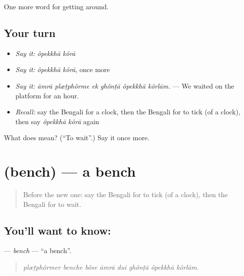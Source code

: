 \begin{grammarlens}[title={What you've built}]
One more word for getting around.
\end{grammarlens}

\subsection*{Your turn}
\begin{itemize}
\raggedright
  \item \emph{Say it:} \emph{ôpekkhā kôrā}
  \item \emph{Say it:} \emph{ôpekkhā kôrā}, once more
  \item \emph{Say it:} \emph{āmrā plæṭphôrme ek ghônṭā ôpekkhā kôrlām.} — We waited on the platform for an hour.
  \item \emph{Recall:} say the Bengali for a clock, then the Bengali for to tick (of a clock), then say \emph{ôpekkhā kôrā} again
\end{itemize}

\begin{tcolorbox}[breakable,colback=teal!4,colframe=teal!35!black,title={Before you move on}]
What does   mean? (\textquotedblleft{}To wait\textquotedblright{}.) Say it once more.
\end{tcolorbox}
\section[\texorpdfstring{\bn{বেঞ্চ} (bench)}{বেঞ্চ (bench)}]{ (bench) — a bench}

\label{lesson:BN-C385-bench}



\begin{quote}
Before the new one: say the Bengali for to tick (of a clock), then the Bengali for to wait.
\end{quote}

\subsection*{You'll want to know: }
\textbf{} — \emph{bench} — \textquotedblleft{}a bench\textquotedblright{}.

\begin{quote}
       
\end{quote}

\begin{quote}
\emph{plæṭphôrmer benche bôse āmrā dui ghônṭā ôpekkhā kôrlām.}
\end{quote}

